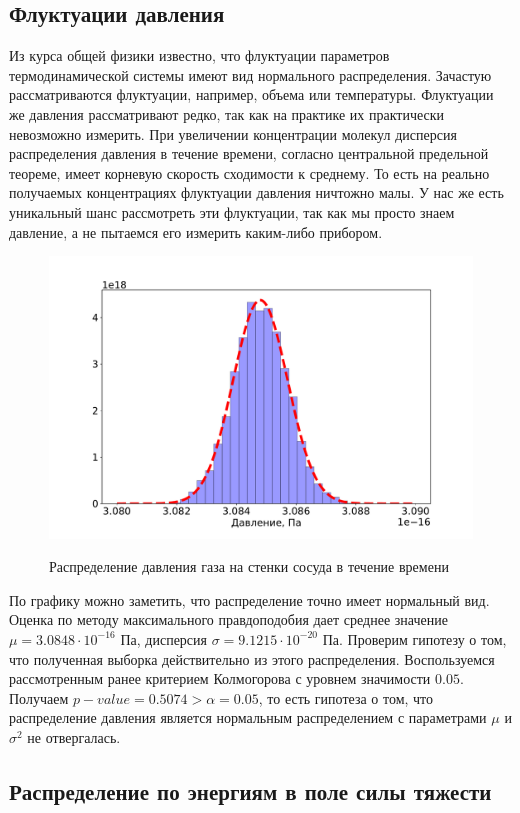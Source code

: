 \documentclass[twoside,twocolumn, 11pt]{article}
\theoremstyle{plain}
\theoremstyle{definition}
\begin{document}
\subsection{Флуктуации давления}
Из курса общей физики известно, что флуктуации параметров термодинамической системы имеют вид нормального распределения.
Зачастую рассматриваются флуктуации, например, объема или температуры. Флуктуации же давления рассматривают редко, так как на
практике их практически невозможно измерить. При увеличении концентрации молекул дисперсия распределения давления в течение времени, согласно
центральной предельной теореме, имеет корневую скорость сходимости к среднему. То есть на реально получаемых концентрациях флуктуации давления
ничтожно малы. У нас же есть уникальный шанс рассмотреть эти флуктуации, так как мы просто знаем давление, а не пытаемся его измерить каким-либо прибором.
\begin{figure}[h!]
{\includegraphics[width=1\linewidth]{hist_p}}
\caption{Распределение давления газа на стенки сосуда в течение времени}
\end{figure}
По графику можно заметить, что распределение точно имеет нормальный вид. Оценка по методу максимального правдоподобия дает
среднее значение $\mu = 3.0848 \cdot 10^{-16}$ Па, дисперсия $\sigma = 9.1215 \cdot 10^{-20}$ Па. Проверим гипотезу о том, что
полученная выборка действительно из этого распределения. Воспользуемся рассмотренным ранее критерием Колмогорова с уровнем
значимости $0.05$. Получаем $p-value = 0.5074 > \alpha = 0.05$, то есть гипотеза о том, что распределение давления является
нормальным распределением с параметрами $\mu$ и $\sigma^2$ не отвергалась.

\subsection{Распределение по энергиям в поле силы тяжести}
\end{document}
